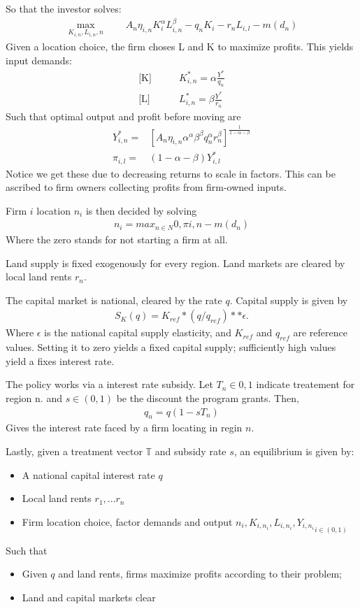 \documentclass[12pt]{article}
\begin{document}
So that the investor solves:
\begin{align}
\max_{K_{i,n}, L_{i,n}, n} \qquad A_n\eta_{i, n}K_i^\alpha L_{i, n}^\beta - q_n K_i - r_n L_{i, l} - m(d_n)
\end{align}
Given a location choice, the firm choses L and K to maximize profits. This yields input demands:
\begin{align}
    \text{[K]} \qquad &  K_{i, n}^* = \alpha \frac{Y^*}{q_n}\\
    \text{[L]} \qquad & L_{i, n}^* = \beta \frac{Y^*}{r_n}
\end{align}
Such that optimal output and profit before moving are
\begin{align}
    Y_{i,n}^* =& [A_n\eta_{i, n}\alpha^\alpha \beta^\beta q_n^\alpha r_{n}^\beta]^\frac{1}{1-\alpha-\beta}\\
    \pi_{i, l} =& (1-\alpha-\beta)Y_{i,l}^*
\end{align}
Notice we get these due to decreasing returns to scale in factors.
This can be ascribed to firm owners collecting profits from firm-owned inputs.

Firm \(i\) location \(n_i\) is then decided by solving
\begin{align}
  n_i = max_{n \in N}{0, \pi{i, n} - m(d_n)}
\end{align}
Where the zero stands for not starting a firm at all.

Land supply is fixed exogenously for every region. 
Land markets are cleared by local land rents \(r_n\).

The capital market is national, cleared by the rate \(q\). Capital supply is given by
\begin{align}
  S_K(q) = K_{ref} * (q / q_{ref})**\epsilon.
\end{align}
Where \(\epsilon\) is the national capital supply elasticity, and \(K_{ref}\) and \(q_{ref}\) are reference values.
Setting it to zero yields a fixed capital supply; sufficiently high values yield a fixes interest rate.

The policy works via a interest rate subsidy. Let \(T_n \in {0, 1}\) indicate treatement for region n.
and \(s \in (0, 1)\) be the discount the program grants. Then,
\begin{align}
  q_n = q(1-sT_n)
\end{align}
Gives the interest rate faced by a firm locating in regin \(n\).

Lastly, given a treatment vector \(\mathbb{T}\) and subsidy rate \(s\),
an equilibrium is given by:
\begin{itemize}
  \item A national capital interest rate \(q\)
  \item Local land rents \({r_1, ... r_n}\)
  \item Firm location choice, factor demands and output \({n_i, K_{i, n_i}, L_{i, n_i}, Y_{i, n_i}}_{i \in (0, 1)}\)
\end{itemize}
Such that
\begin{itemize}
  \item Given \(q\) and land rents, firms maximize profits according to their problem;
  \item Land and capital markets clear
\end{itemize}
\end{document}
